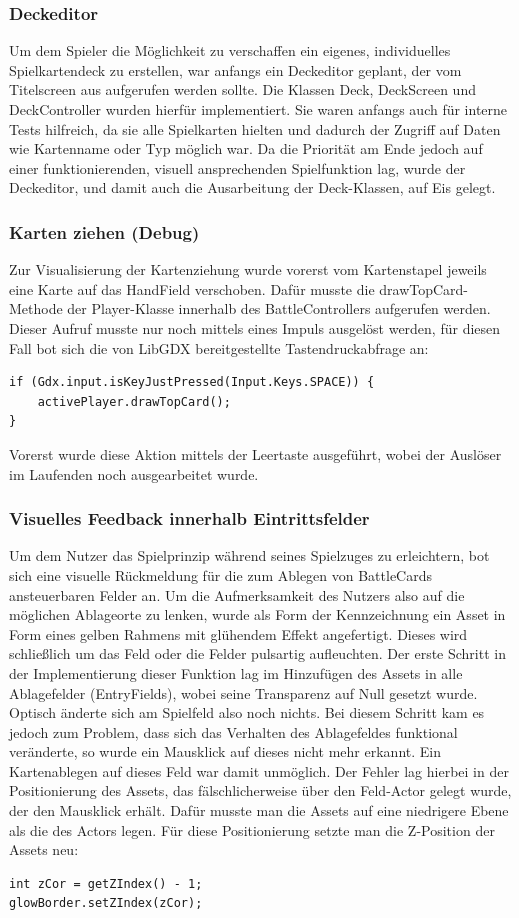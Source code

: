 \subsubsection{Deckeditor}
Um dem Spieler die Möglichkeit zu verschaffen ein eigenes, individuelles Spielkartendeck zu erstellen, war anfangs ein Deckeditor geplant, der vom Titelscreen aus aufgerufen werden sollte. Die Klassen Deck, DeckScreen und DeckController wurden hierfür implementiert. Sie waren anfangs auch für interne Tests hilfreich, da sie alle Spielkarten hielten und dadurch der Zugriff auf Daten wie Kartenname oder Typ möglich war. Da die Priorität am Ende jedoch auf einer funktionierenden, visuell ansprechenden Spielfunktion lag, wurde der Deckeditor, und damit auch die Ausarbeitung der Deck-Klassen, auf Eis gelegt.

\subsubsection{Karten ziehen (Debug)}
Zur Visualisierung der Kartenziehung wurde vorerst vom Kartenstapel jeweils eine Karte auf das HandField verschoben.
Dafür musste die drawTopCard-Methode der Player-Klasse innerhalb des BattleControllers aufgerufen werden.
Dieser Aufruf musste nur noch mittels eines Impuls ausgelöst werden, für diesen Fall bot sich die von LibGDX bereitgestellte Tastendruckabfrage an:
\begin{lstlisting}
if (Gdx.input.isKeyJustPressed(Input.Keys.SPACE)) {
	activePlayer.drawTopCard();
}
\end{lstlisting}
Vorerst wurde diese Aktion mittels der Leertaste ausgeführt, wobei der Auslöser im Laufenden noch ausgearbeitet wurde.

\subsubsection{Visuelles Feedback innerhalb Eintrittsfelder}
Um dem Nutzer das Spielprinzip während seines Spielzuges zu erleichtern, bot sich eine visuelle Rückmeldung für die zum Ablegen von BattleCards ansteuerbaren Felder an. Um die Aufmerksamkeit des Nutzers also auf die möglichen Ablageorte zu lenken, wurde als Form der Kennzeichnung ein Asset in Form eines gelben Rahmens mit glühendem Effekt angefertigt. Dieses wird schließlich um das Feld oder die Felder pulsartig aufleuchten.
Der erste Schritt in der Implementierung dieser Funktion lag im Hinzufügen des Assets in alle Ablagefelder (EntryFields), wobei seine Transparenz auf Null gesetzt wurde. Optisch änderte sich am Spielfeld also noch nichts.
Bei diesem Schritt kam es jedoch zum Problem, dass sich das Verhalten des Ablagefeldes funktional veränderte, so wurde ein Mausklick auf dieses nicht mehr erkannt. Ein Kartenablegen auf dieses Feld war damit unmöglich.
Der Fehler lag hierbei in der Positionierung des Assets, das fälschlicherweise über den Feld-Actor gelegt wurde, der den Mausklick erhält. Dafür musste man die Assets auf eine niedrigere Ebene als die des Actors legen. Für diese Positionierung setzte man die Z-Position der Assets neu:
\begin{lstlisting}
int zCor = getZIndex() - 1;
glowBorder.setZIndex(zCor);
\end{lstlisting}

